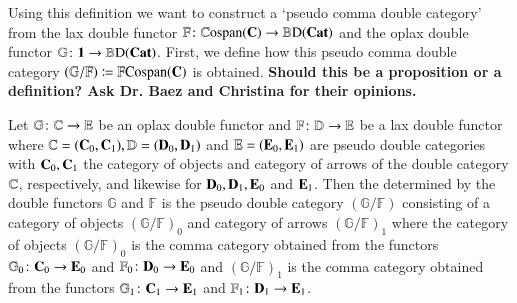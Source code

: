 \documentclass{amsart}
\begin{document}
Using this definition we want to construct a `pseudo comma double category' from the lax double functor $\mathbb{F} \colon \mathbb{C}\textnormal{ospan}(\bold{C}) \to \mathbb{B} \textnormal{D}(\bold{Cat})$ and the oplax double functor $\mathbb{G} \colon \bold{1} \to \mathbb{B}\textnormal{D}(\bold{Cat})$. First, we define how this pseudo comma double category $(\mathbb{G} / \mathbb{F}) \coloneqq \mathbb{F}\textnormal{Cospan}(\bold{C})$ is obtained.
\textbf{Should this be a proposition or a definition? Ask Dr. Baez and Christina for their opinions.}
\begin{defn}
Let $\mathbb{G} \colon \mathbb{C} \to \mathbb{E}$ be an oplax double functor and $\mathbb{F} \colon \mathbb{D} \to \mathbb{E}$ be a lax double functor where $\mathbb{C} = (\bold{C}_{0},\bold{C}_{1}), \mathbb{D} = (\bold{D}_{0}, \bold{D}_{1})$ and $\mathbb{E} = (\bold{E}_{0}, \bold{E}_{1})$ are pseudo  double categories with $\bold{C}_{0}, \bold{C}_{1}$ the category of objects and category of arrows of the double category $\mathbb{C}$, respectively, and likewise for $\bold{D}_{0}, \bold{D}_{1}, \bold{E}_{0}$ and $\bold{E}_{1}$. Then the  determined by the double functors $\mathbb{G}$ and $\mathbb{F}$ is the pseudo double category $(\mathbb{G} / \mathbb{F})$ consisting of a category of objects $(\mathbb{G} / \mathbb{F})_{0}$ and category of arrows $(\mathbb{G} / \mathbb{F})_{1}$ where the category of objects $(\mathbb{G} / \mathbb{F})_0$ is the comma category obtained from the functors $\mathbb{G}_0 \colon \bold{C}_{0} \to \bold{E}_{0}$ and $\mathbb{F}_0 \colon \bold{D}_{0} \to \bold{E}_{0}$ and $(\mathbb{G} / \mathbb{F})_1$ is the comma category obtained from the functors $\mathbb{G}_{1} \colon \bold{C}_{1} \to \bold{E}_{1}$ and $\mathbb{F}_1 \colon \bold{D}_{1} \to \bold{E}_{1}$.
\end{defn}
\end{document}
